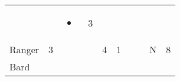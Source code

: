 \documentclass[12pt]{article}
\begin{document}
\begin{longtable}[]{@{}llllllllll@{}}
\begin{minipage}[t]{0.06\columnwidth}
\strut\end{minipage} &
\begin{minipage}[t]{0.06\columnwidth}\raggedright\strut
\strut\end{minipage} &
\begin{minipage}[t]{0.07\columnwidth}\raggedright\strut
\begin{itemize}
\item
\end{itemize}
\strut\end{minipage} &
\begin{minipage}[t]{0.08\columnwidth}\raggedright\strut
3
\strut\end{minipage}\tabularnewline
\begin{minipage}[t]{0.13\columnwidth}\raggedright\strut
Ranger
\strut\end{minipage} &
\begin{minipage}[t]{0.06\columnwidth}\raggedright\strut
3
\strut\end{minipage} &
\begin{minipage}[t]{0.06\columnwidth}\raggedright\strut
\strut\end{minipage} &
\begin{minipage}[t]{0.06\columnwidth}\raggedright\strut
\strut\end{minipage} &
\begin{minipage}[t]{0.06\columnwidth}\raggedright\strut
4
\strut\end{minipage} &
\begin{minipage}[t]{0.06\columnwidth}\raggedright\strut
1
\strut\end{minipage} &
\begin{minipage}[t]{0.06\columnwidth}\raggedright\strut
\strut\end{minipage} &
\begin{minipage}[t]{0.06\columnwidth}\raggedright\strut
\strut\end{minipage} &
\begin{minipage}[t]{0.07\columnwidth}\raggedright\strut
N
\strut\end{minipage} &
\begin{minipage}[t]{0.08\columnwidth}\raggedright\strut
8
\strut\end{minipage}\tabularnewline
\begin{minipage}[t]{0.13\columnwidth}\raggedright\strut
Bard
\strut\end{minipage} &
\begin{minipage}[t]{0.06\columnwidth}\raggedright\strut
\strut\end{minipage} &

\end{longtable}
\end{document}
